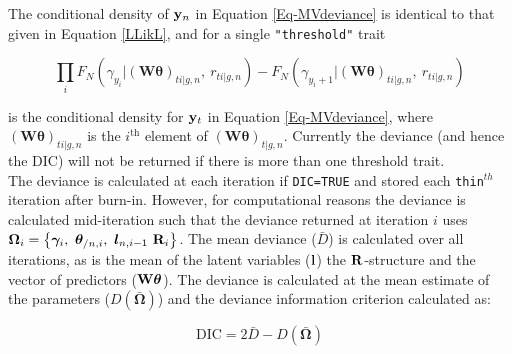 \documentclass{article}
\begin{document}
The conditional density of ${\bf y}_{n}$ in Equation \ref{Eq-MVdeviance} is identical to that given in Equation \ref{LLikL},  and for a single \texttt{"threshold"} trait  


\begin{equation}
\prod_{i} F_{N}(\gamma_{y_{i}} | ({\bm W}{\bm \theta})_{ti|g,n}, \ r_{ti|g, n})-F_{N}(\gamma_{y_{i}+1} | ({\bm W}{\bm \theta})_{ti|g,n}, \ r_{ti|g, n})
\label{Eq-cpmvnorm}
\end{equation}

is the conditional density for ${\bf y}_{t}$ in Equation \ref{Eq-MVdeviance}, where $({\bm W}{\bm \theta})_{ti|g,n}$ is the $i^{\textrm{th}}$ element of $({\bm W}{\bm \theta})_{t|g,n}$. Currently the deviance (and hence the DIC) will not be returned if there is more than one threshold trait.\\

The deviance is calculated at each iteration if \texttt{DIC=TRUE} and stored each \texttt{thin}$^{th}$ iteration after burn-in.  However, for computational reasons the deviance is calculated mid-iteration such that the deviance returned at iteration $i$  uses ${\bm \Omega}_{i} = \left\{{\bm \gamma}_{i},\ {\bm \theta}_{/n, i},\ {\bm l}_{n, i-1}\ {\bf R}_{i}\right\}$. The mean deviance ($\bar{D}$) is calculated over all iterations, as is the mean of the latent variables (${\bf l}$) the ${\bf R}$-structure and the vector of predictors (${\bf W}{\bm \theta}$).  The deviance is calculated at the mean estimate of the parameters ($D(\bar{\bm \Omega})$) and the deviance information criterion calculated as:

\begin{equation}
\textrm{DIC} = 2\bar{D}-D(\bar{\bm \Omega})
\end{equation}
\end{document}
